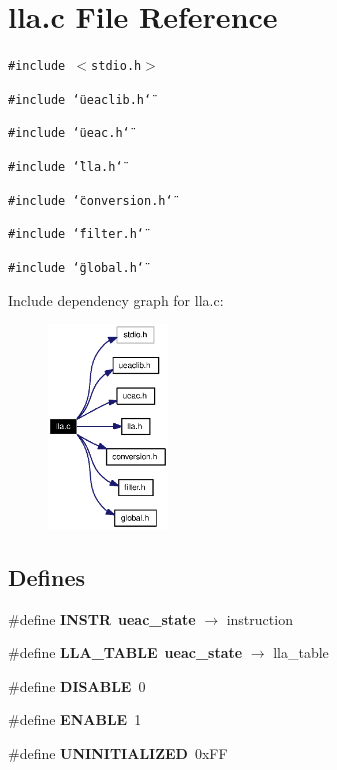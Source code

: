 \section{lla.c File Reference}
\label{lla_8c}
{\tt \#include $<$stdio.h$>$}\par
{\tt \#include \char`\"{}ueaclib.h\char`\"{}}\par
{\tt \#include \char`\"{}ueac.h\char`\"{}}\par
{\tt \#include \char`\"{}lla.h\char`\"{}}\par
{\tt \#include \char`\"{}conversion.h\char`\"{}}\par
{\tt \#include \char`\"{}filter.h\char`\"{}}\par
{\tt \#include \char`\"{}global.h\char`\"{}}\par


Include dependency graph for lla.c:\begin{figure}[H]
\begin{center}
\leavevmode
\includegraphics[width=90pt]{lla_8c__incl}
\end{center}
\end{figure}
\subsection*{Defines}
\begin{CompactItemize}
\item 
\#define {\bf INSTR}~{\bf ueac\_\-state} $\rightarrow$ instruction
\item 
\#define {\bf LLA\_\-TABLE}~{\bf ueac\_\-state} $\rightarrow$ lla\_\-table
\item 
\#define {\bf DISABLE}~0
\item 
\#define {\bf ENABLE}~1
\item 
\#define {\bf UNINITIALIZED}~0x\-FF
\end{CompactItemize}
